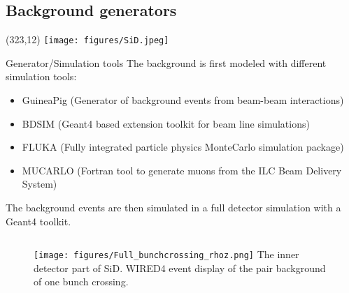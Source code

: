 \documentclass[xcolor={dvipsnames}]{beamer}
\newcommand{\sidlogo}{
  \setlength{\TPHorizModule}{1pt}
  \setlength{\TPVertModule}{1pt}
  \begin{textblock}{1}(323,12)
   \texttt{[image: figures/SiD.jpeg]}
  \end{textblock}
  }
\begin{document}
\subsection{Background generators}
\sidlogo
\begin{frame}{Generator/Simulation tools}
The background is first modeled with different simulation tools:\\
\begin{itemize}
\item \alert{GuineaPig} (Generator of background events from beam-beam interactions)
\item \alert{BDSIM} (Geant4 based extension toolkit for beam line simulations)
\item \alert{FLUKA} (Fully integrated particle physics MonteCarlo simulation package)
\item \alert{MUCARLO} (Fortran tool to generate muons from the ILC Beam Delivery System)
\end{itemize}
The background events are then simulated in a \alert{full detector simulation} with a Geant4 toolkit.
\begin{figure}
	\begin{columns}
         \flushright
        \texttt{[image: figures/Full\_bunchcrossing\_rhoz.png]}
        {\small The inner detector part of SiD. WIRED4 event display of the pair background of one bunch crossing.}
      \end{columns}
\end{figure}
	
\end{frame}
\end{document}
